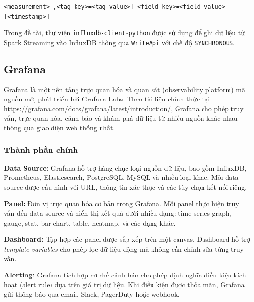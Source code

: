\begin{lstlisting}[caption={Cú pháp Line Protocol của InfluxDB}]
<measurement>[,<tag_key>=<tag_value>] <field_key>=<field_value> [<timestamp>]
\end{lstlisting}

Trong đề tài, thư viện \texttt{influxdb-client-python} được sử dụng để ghi dữ liệu
từ Spark Streaming vào InfluxDB thông qua \texttt{WriteApi} với chế độ
\texttt{SYNCHRONOUS}.

\subsection{Grafana}

Grafana là một nền tảng trực quan hóa và quan sát (observability platform) mã nguồn
mở, phát triển bởi Grafana Labs. Theo tài liệu chính thức tại
\url{https://grafana.com/docs/grafana/latest/introduction/}, Grafana cho phép truy
vấn, trực quan hóa, cảnh báo và khám phá dữ liệu từ nhiều nguồn khác nhau thông
qua giao diện web thống nhất.

\subsubsection{Thành phần chính}

\textbf{Data Source:} Grafana hỗ trợ hàng chục loại nguồn dữ liệu, bao gồm
InfluxDB, Prometheus, Elasticsearch, PostgreSQL, MySQL và nhiều loại khác. Mỗi
data source được cấu hình với URL, thông tin xác thực và các tùy chọn kết nối
riêng.

\textbf{Panel:} Đơn vị trực quan hóa cơ bản trong Grafana. Mỗi panel thực hiện
truy vấn đến data source và hiển thị kết quả dưới nhiều dạng: time-series graph,
gauge, stat, bar chart, table, heatmap, và các dạng khác.

\textbf{Dashboard:} Tập hợp các panel được sắp xếp trên một canvas. Dashboard hỗ
trợ \emph{template variables} cho phép lọc dữ liệu động mà không cần chỉnh sửa
từng truy vấn.

\textbf{Alerting:} Grafana tích hợp cơ chế cảnh báo cho phép định nghĩa điều kiện
kích hoạt (alert rule) dựa trên giá trị dữ liệu. Khi điều kiện được thỏa mãn,
Grafana gửi thông báo qua email, Slack, PagerDuty hoặc webhook.

